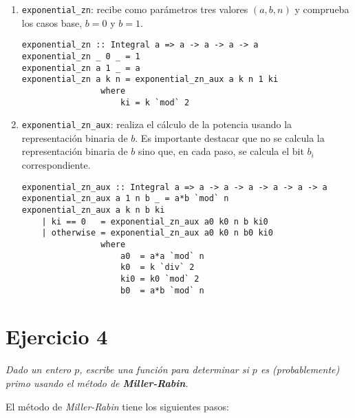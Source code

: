 \documentclass[10pt,spanish]{article}
\begin{document}
\begin{enumerate}[---]
    \item \texttt{exponential\_zn}: recibe como parámetros tres valores $(a, b, n)$ y comprueba los casos base, $b=0$ y $b=1$.

\begin{verbatim}
exponential_zn :: Integral a => a -> a -> a -> a
exponential_zn _ 0 _ = 1
exponential_zn a 1 _ = a
exponential_zn a k n = exponential_zn_aux a k n 1 ki
                where
                    ki = k `mod` 2
\end{verbatim}

    \item \texttt{exponential\_zn\_aux}: realiza el cálculo de la potencia usando la representación binaria de $b$. Es importante destacar que no se calcula la representación binaria de $b$ sino que, en cada paso, se calcula el bit $b_i$ correspondiente.

\begin{verbatim}
exponential_zn_aux :: Integral a => a -> a -> a -> a -> a -> a
exponential_zn_aux a 1 n b _ = a*b `mod` n
exponential_zn_aux a k n b ki
    | ki == 0   = exponential_zn_aux a0 k0 n b ki0
    | otherwise = exponential_zn_aux a0 k0 n b0 ki0
                where
                    a0  = a*a `mod` n
                    k0  = k `div` 2
                    ki0 = k0 `mod` 2
                    b0  = a*b `mod` n
\end{verbatim}
\end{enumerate}

\section{\textcolor{rojo}Ejercicio 4}
\textit{Dado un entero $p$, escribe una función para determinar si $p$ es (probablemente) primo usando el método de \textbf{\textcolor{rojo}{Miller-Rabin}}.}

El método de \textit{\textcolor{rojo}{Miller-Rabin}} tiene los siguientes pasos:
\end{document}
